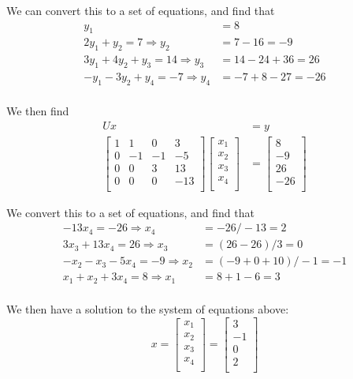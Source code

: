 We can convert this to a set of equations, and find that
\begin{align*}
    y_1 &= 8 \\
    2y_1 + y_2 = 7 \Rightarrow y_2 &= 7 - 16 = -9 \\
    3y_1 + 4y_2 + y_3 = 14 \Rightarrow y_3 &= 14 - 24 + 36 = 26 \\
    -y_1 - 3y_2 + y_4 = -7 \Rightarrow y_4 &= -7 + 8 -27 = -26 \\
\end{align*}

We then find
\begin{align*}
    Ux &= y \\
    \begin{bmatrix}
        1 & 1 & 0 & 3 \\
        0 & -1 & -1 & -5 \\
        0 & 0 & 3 & 13 \\
        0 & 0 & 0 & -13 \\
    \end{bmatrix}
    \begin{bmatrix}
        x_1 \\ x_2 \\ x_3 \\ x_4 \\
    \end{bmatrix}
    &= \begin{bmatrix}
        8 \\ -9 \\ 26 \\ -26 \\
    \end{bmatrix}
\end{align*}

We convert this to a set of equations, and find that
\begin{align*}
    -13x_4 = -26 \Rightarrow x_4 &= -26 / -13 = 2 \\
    3x_3 + 13x_4 = 26 \Rightarrow x_3 &= (26 - 26) / 3 = 0 \\
    -x_2 - x_3 - 5x_4 = -9 \Rightarrow x_2 &= (-9 + 0 + 10) / -1 = -1 \\
    x_1 + x_2 + 3x_4 = 8 \Rightarrow x_1 &= 8 + 1 - 6 = 3 \\
\end{align*}

We then have a solution to the system of equations above:
\begin{equation*}
    x = \begin{bmatrix}
        x_1 \\ x_2 \\ x_3 \\ x_4 \\
    \end{bmatrix}
     = \begin{bmatrix}
        3 \\ -1 \\ 0 \\ 2 \\
    \end{bmatrix}
\end{equation*}
